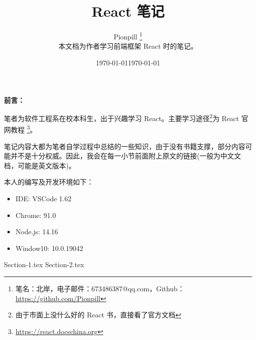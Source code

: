 \documentclass{PionpillNote-book}
\title{React 笔记}
\author{
    Pionpill \footnote{笔名：北岸，电子邮件：673486387@qq.com，Github：\url{https://github.com/Pionpill}} \\
    本文档为作者学习前端框架 React 时的笔记。\\
}
\date{\today}
\begin{document}
\pagestyle{plain}
\maketitle

\noindent\textbf{前言：}

笔者为软件工程系在校本科生，出于兴趣学习 React。主要学习途径\footnote{由于市面上没什么好的 React 书，直接看了官方文档}为 React 官网教程 \footnote{\url{https://react.docschina.org}}。

笔记内容大都为笔者自学过程中总结的一些知识，由于没有书籍支撑，部分内容可能并不是十分权威。因此，我会在每一小节前面附上原文的链接(一般为中文文档，可能是英文版本)。

本人的编写及开发环境如下：
\begin{itemize}
    \item IDE: VSCode 1.62
    \item Chrome: 91.0
    \item Node.js: 14.16
    \item Window10: 10.0.19042
\end{itemize}



\date{\today}
\newpage

\tableofcontents

\newpage

\setcounter{page}{1} 
\pagestyle{fancy}


{Section-1.tex}
{Section-2.tex}
\end{document}
